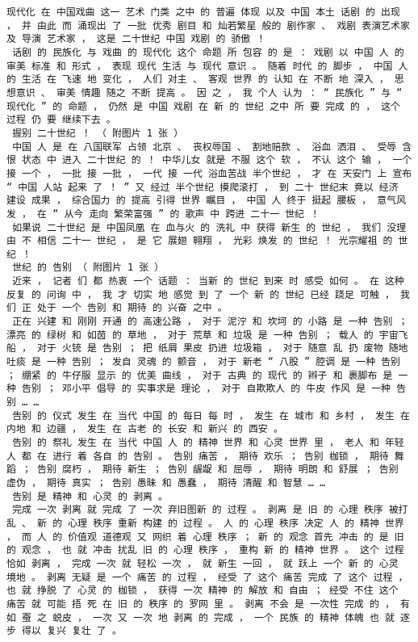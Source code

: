 \documentclass{article}
\begin{document}
\begin{Verbatim}[commandchars=\\\{\}]
 现代化 在 中国戏曲 这一 艺术 门类 之中 的 普遍 体现 以及 中国 本土 话剧 的 出现 ， 并 由此 而 涌现出 了 一批 优秀 剧目 和 灿若繁星 般的 剧作家 、 戏剧 表演艺术家 及 导演 艺术家 ， 这是 二十世纪 中国 戏剧 的 骄傲 ！ 
 话剧 的 民族化 与 戏曲 的 现代化 这个 命题 所 包容 的 是 ： 戏剧 以 中国 人 的 审美 标准 和 形式 ， 表现 现代 生活 与 现代 意识 。 随着 时代 的 脚步 ， 中国 人 的 生活 在 飞速 地 变化 ， 人们 对主 、 客观 世界 的 认知 在 不断 地 深入 ， 思想意识 、 审美 情趣 随之 不断 提高 。 因 之 ， 我 个人 认为 ： “ 民族化 ” 与 “ 现代化 ” 的 命题 ， 仍然 是 中国 戏剧 在 新 的 世纪 之中 所 要 完成 的 ， 这个 过程 仍 要 继续下去 。 
 握别 二十世纪 ！ （ 附图片 1 张 ） 
 中国 人 是 在 八国联军 占领 北京 、 丧权辱国 、 割地赔款 、 浴血 洒泪 、 受辱 含恨 状态 中 进入 二十世纪 的 ！ 中华儿女 就是 不服 这个 软 ， 不认 这个 输 ， 一个 接 一个 ， 一批 接 一批 ， 一代 接 一代 浴血苦战 半个世纪 ， 才 在 天安门 上 宣布 “ 中国 人站 起来 了 ！ ” 又 经过 半个世纪 摸爬滚打 ， 到 二十 世纪末 竟以 经济 建设 成果 ， 综合国力 的 提高 引得 世界 瞩目 ， 中国 人 终于 挺起 腰板 ， 意气风发 ， 在 “ 从今 走向 繁荣富强 ” 的 歌声 中 跨进 二十一 世纪 ！ 
 如果说 二十世纪 是 中国凤凰 在 血与火 的 洗礼 中 获得 新生 的 世纪 ， 我们 没理由 不 相信 二十一 世纪 ， 是 它 展翅 翱翔 ， 光彩 焕发 的 世纪 ！ 光宗耀祖 的 世纪 ！ 
 世纪 的 告别 （ 附图片 1 张 ） 
 近来 ， 记者 们 都 热衷 一个 话题 ： 当新 的 世纪 到来 时 感受 如何 。 在 这种 反复 的 问询 中 ， 我 才 切实 地 感觉 到 了 一个 新 的 世纪 已经 跷足 可触 ， 我们 正 处于 一个 告别 和 期待 的 兴奋 之中 。 
 正在 兴建 和 刚刚 开通 的 高速公路 ， 对于 泥泞 和 坎坷 的 小路 是 一种 告别 ； 漂亮 的 绿树 和 如茵 的 草地 ， 对于 荒草 和 垃圾 是 一种 告别 ； 载人 的 宇宙飞船 ， 对于 火铳 是 告别 ； 把 纸屑 果皮 扔进 垃圾箱 ， 对于 随意 乱 扔 废物 随地吐痰 是 一种 告别 ； 发自 灵魂 的 颤音 ， 对于 新老 “ 八股 ” 腔调 是 一种 告别 ； 绷紧 的 牛仔服 显示 的 优美 曲线 ， 对于 古典 的 现代 的 辫子 和 裹脚布 是 一种 告别 ； 邓小平 倡导 的 实事求是 理论 ， 对于 自欺欺人 的 牛皮 作风 是 一种 告别 … … 
 告别 的 仪式 发生 在 当代 中国 的 每日 每 时 ， 发生 在 城市 和 乡村 ， 发生 在 内地 和 边疆 ， 发生 在 古老 的 长安 和 新兴 的 西安 。 
 告别 的 祭礼 发生 在 当代 中国 人 的 精神 世界 和 心灵 世界 里 ， 老人 和 年轻人 都 在 进行 着 各自 的 告别 。 告别 痛苦 ， 期待 欢乐 ； 告别 枷锁 ， 期待 舞蹈 ； 告别 腐朽 ， 期待 新生 ； 告别 龌龊 和 屈辱 ， 期待 明朗 和 舒展 ； 告别 虚伪 ， 期待 真实 ； 告别 愚昧 和 愚蠢 ， 期待 清醒 和 智慧 … … 
 告别 是 精神 和 心灵 的 剥离 。 
 完成 一次 剥离 就 完成 了 一次 弃旧图新 的 过程 。 剥离 是 旧 的 心理 秩序 被打乱 、 新 的 心理 秩序 重新 构建 的 过程 。 人 的 心理 秩序 决定 人 的 精神 世界 ， 而 人 的 价值观 道德观 又 网织 着 心理 秩序 ； 新 的 观念 首先 冲击 的 是 旧 的 观念 ， 也 就 冲击 扰乱 旧 的 心理 秩序 ， 重构 新 的 精神 世界 。 这个 过程 恰如 剥离 ， 完成 一次 就 轻松 一次 ， 就 新生 一回 ， 就 跃上 一个 新 的 心灵 境地 。 剥离 无疑 是 一个 痛苦 的 过程 ， 经受 了 这个 痛苦 完成 了 这个 过程 ， 也 就 挣脱 了 心灵 的 枷锁 ， 获得 一次 精神 的 解放 和 自由 ； 经受 不住 这个 痛苦 就 可能 捂 死 在 旧 的 秩序 的 罗网 里 。 剥离 不会 是 一次性 完成 的 ， 有如 蚕 之 蜕皮 ， 一次 又 一次 地 剥离 的 完成 ， 一个 民族 的 精神 体魄 也 就 逐步 得以 复兴 复壮 了 。 

\end{Verbatim}
\end{document}
